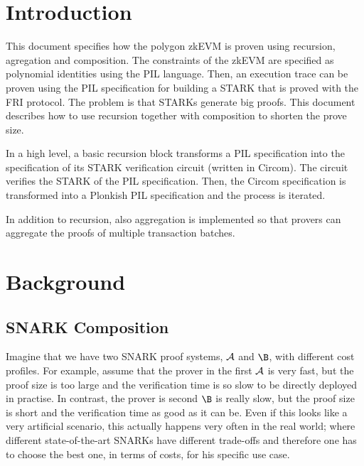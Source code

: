 

\section{Introduction}

This document specifies how the polygon zkEVM is proven using 
recursion, agregation and composition.
The constraints of the zkEVM are specified as polynomial identities using the 
PIL language. Then, an execution trace can be proven using the PIL specification for 
building a STARK that is proved with the FRI protocol.
The problem is that STARKs generate big proofs. 
This document describes how to use recursion together with composition to shorten the prove size.

In a high level, a basic recursion block transforms a PIL specification into the 
specification of its STARK verification circuit (written in Circom). 
The circuit verifies the STARK of the PIL specification. 
Then, the Circom specification is transformed into a Plonkish PIL specification and the process is iterated.

In addition to recursion, also aggregation is implemented so that provers 
can aggregate the proofs of multiple transaction batches. 


\ifBACKGROUND
\section{Background}

\subsection{SNARK Composition} \label{sec:composition}

Imagine that we have two SNARK proof systems, $\mathcal{A}$ and $\B$, with different cost profiles. For example, assume that the prover in the first $\mathcal{A}$ is very fast, but the proof size is too large and the verification time is so slow to be directly deployed in practise. In contrast, the prover is second $\B$ is really slow, but the proof size is short and the verification time as good as it can be. Even if this looks like a very artificial scenario, this actually happens very often in the real world; where different state-of-the-art SNARKs have different trade-offs and therefore one has to choose the best one, in terms of costs, for his specific use case.

